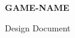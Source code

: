\begin{titlepage}	
	\begin{center}
		\vspace*{2cm}
		{\LARGE \textbf{GAME-NAME}}
	\end{center}
	\vspace{1cm}
	\begin{center}   
		{\large Design Document}
	\end{center}
\end{titlepage}